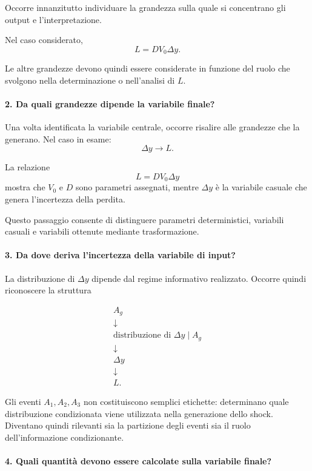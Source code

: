 Occorre innanzitutto individuare la grandezza sulla quale si concentrano gli
output e l'interpretazione.

Nel caso considerato,
\[
L=D V_{0}\Delta y.
\]

Le altre grandezze devono quindi essere considerate in funzione del ruolo che
svolgono nella determinazione o nell'analisi di $L$.

\paragraph{2. Da quali grandezze dipende la variabile finale?}

Una volta identificata la variabile centrale, occorre risalire alle grandezze
che la generano. Nel caso in esame:
\[
\Delta y
\longrightarrow
L.
\]

La relazione
\[
L=D V_{0}\Delta y
\]
mostra che $V_{0}$ e $D$ sono parametri assegnati, mentre $\Delta y$ \`{e} la
variabile casuale che genera l'incertezza della perdita.

Questo passaggio consente di distinguere parametri deterministici, variabili
casuali e variabili ottenute mediante trasformazione.

\paragraph{3. Da dove deriva l'incertezza della variabile di input?}

La distribuzione di $\Delta y$ dipende dal regime informativo realizzato.
Occorre quindi riconoscere la struttura

\vspace{-0.5cm}

\begin{gather*}
A_g\\
\downarrow\\
\text{distribuzione di } \Delta y\mid A_g\\
\downarrow\\
\Delta y\\
\downarrow\\
L.
\end{gather*}

Gli eventi $A_{1},A_{2},A_{3}$ non costituiscono semplici etichette:
determinano quale distribuzione condizionata viene utilizzata nella
generazione dello shock. Diventano quindi rilevanti sia la partizione degli
eventi sia il ruolo dell'informazione condizionante.

\paragraph{4. Quali quantit\`{a} devono essere calcolate sulla variabile finale?}

